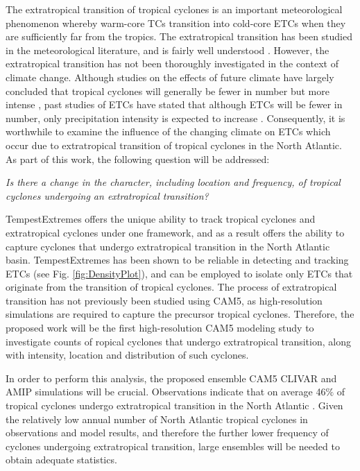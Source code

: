 \documentclass[11pt]{article}
\begin{document}
The extratropical transition of tropical cyclones is an important meteorological phenomenon whereby warm-core TCs transition into cold-core ETCs when they are sufficiently far from the tropics.  The extratropical transition has been studied in the meteorological literature, and is fairly well understood \citep{hart2001climatology}.  However, the extratropical transition has not been thoroughly investigated in the context of climate change.  Although studies on the effects of future climate have largely concluded that tropical cyclones will generally be fewer in number but more intense \citep{Knutson2010}, past studies of ETCs have stated that although ETCs will be fewer in number, only precipitation intensity is expected to increase \citep{bengtsson2009will}.  Consequently, it is worthwhile to examine the influence of the changing climate on ETCs which occur due to extratropical transition of tropical cyclones in the North Atlantic.  As part of this work, the following question will be addressed:

\emph{Is there a change in the character, including location and frequency, of tropical cyclones undergoing an extratropical transition?}

TempestExtremes offers the unique ability to track tropical cyclones and extratropical cyclones under one framework, and as a result offers the ability to capture cyclones that undergo extratropical transition in the North Atlantic basin.  TempestExtremes has been shown to be reliable in detecting and tracking ETCs (see Fig. \ref{fig:DensityPlot}), and can be employed to isolate only ETCs that originate from the transition of tropical cyclones. The process of extratropical transition has not previously been studied using CAM5, as high-resolution simulations are required to capture the precursor tropical cyclones. Therefore, the proposed work will be the first high-resolution CAM5 modeling study to investigate counts of ropical cyclones that undergo extratropical transition, along with intensity, location and distribution of such cyclones.  

In order to perform this analysis, the proposed ensemble CAM5 CLIVAR and AMIP simulations will be crucial.  Observations indicate that on average 46$\%$ of tropical cyclones undergo extratropical transition in the North Atlantic \citep{hart2001climatology}. Given the relatively low annual number of North Atlantic tropical cyclones in observations and model results, and therefore the further lower frequency of cyclones undergoing extratropical transition, large ensembles will be needed to obtain adequate statistics.
\end{document}
